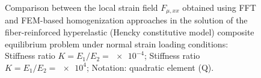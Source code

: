 \begin{figure}[hbt]
\begin{subfigure}[b]{\textwidth}
    \caption{}
    \label{subfig:svk_2D_ratio_-4_normal_strain_11}
  \end{subfigure}
  \caption{Comparison between the local strain field \(F_{\mu,xx}\) obtained using
  FFT and FEM-based homogenization approaches in the solution of the fiber-reinforced
  hyperelastic (Hencky constitutive model) composite equilibrium problem under normal strain loading conditions:
   Stiffness ratio \(K=E_1/E_2=\num{e-4}\);
   Stiffness ratio \(K=E_1/E_2=\num{e4}\);
  Notation: quadratic element (Q).}
\label{fig:svk_2D_stiff_contrast_normal_strain_11}
\end{figure}

\FloatBarrier

\newpage\null\thispagestyle{blank}\newpage
